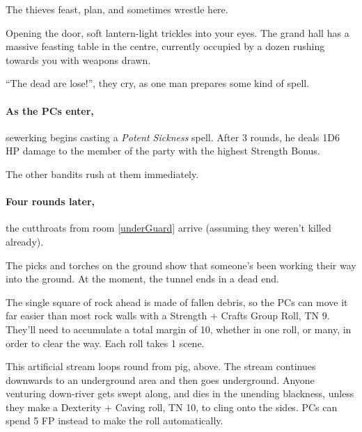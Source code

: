 \begin{multicols}{2}
\label{underHall}

The thieves feast, plan, and sometimes wrestle here.

\begin{boxtext}
  Opening the door, soft lantern-light trickles into your eyes.
  The grand hall has a massive feasting table in the centre, currently occupied by a dozen rushing towards you with weapons drawn.

  ``The dead are lose!'', they cry, as one man prepares some kind of spell.
\end{boxtext}

\paragraph{As the PCs enter,}
\gls{sewerking} begins casting a \textit{Potent Sickness} spell.
After 3 rounds, he deals 1D6 HP damage to the member of the party with the highest Strength Bonus.

The other bandits rush at them immediately.

\sewerking


\paragraph{Four rounds later,}
the cutthroats from room \ref{underGuard} arrive (assuming they weren't killed already).

\label{citadelTunnel}

\begin{boxtext}
  The picks and torches on the ground show that someone's been working their way into the ground.  At the moment, the tunnel ends in a dead end.
\end{boxtext}
 
The single square of rock ahead is made of fallen debris, so the PCs can move it far easier than most rock walls with a Strength + Crafts Group Roll, TN 9.%
\iftoggle{core}%
{\footnote{See the core rules, page \pageref{grouproll}, for Group Rolls.}}%
{}
They'll need to accumulate a total margin of 10, whether in one roll, or many, in order to clear the way.
Each roll takes 1 scene.

\label{slidein}
\label{sewerPig}

This artificial stream loops round from \gls{pig}, above.
The stream continues downwards to an underground area and then goes underground.
Anyone venturing down-river gets swept along, and dies in the unending blackness, unless they make a Dexterity + Caving roll, TN 10, to cling onto the sides.
PCs can spend 5 FP instead to make the roll automatically.


\end{multicols}
